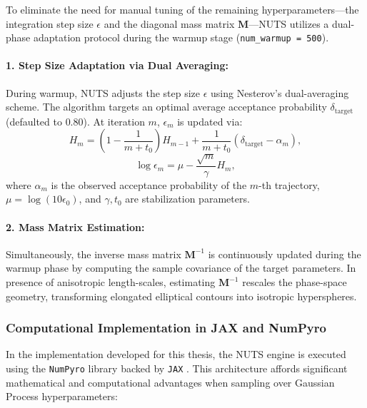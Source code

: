 \documentclass[12pt,oneside]{report}
\theoremstyle{definition}
\theoremstyle{remark}
\begin{document}
To eliminate the need for manual tuning of the remaining hyperparameters—the integration step size $\epsilon$ and the diagonal mass matrix $\mathbf{M}$—NUTS utilizes a dual-phase adaptation protocol during the warmup stage (\texttt{num\_warmup = 500}).

\paragraph{1. Step Size Adaptation via Dual Averaging:} 
During warmup, NUTS adjusts the step size $\epsilon$ using Nesterov's dual-averaging scheme. The algorithm targets an optimal average acceptance probability $\delta_{\text{target}}$ (defaulted to $0.80$). At iteration $m$, $\epsilon_m$ is updated via:
\begin{equation}
    H_m = \left(1 - \frac{1}{m + t_0}\right) H_{m-1} + \frac{1}{m + t_0} \left(\delta_{\text{target}} - \alpha_m\right),
\end{equation}
\begin{equation}
    \log \epsilon_m = \mu - \frac{\sqrt{m}}{\gamma} H_m,
\end{equation}
where $\alpha_m$ is the observed acceptance probability of the $m$-th trajectory, $\mu = \log(10 \epsilon_0)$, and $\gamma, t_0$ are stabilization parameters.

\paragraph{2. Mass Matrix Estimation:}
Simultaneously, the inverse mass matrix $\mathbf{M}^{-1}$ is continuously updated during the warmup phase by computing the sample covariance of the target parameters. In presence of anisotropic length-scales, estimating $\mathbf{M}^{-1}$ rescales the phase-space geometry, transforming elongated elliptical contours into isotropic hyperspheres.

\subsubsection{Computational Implementation in JAX and NumPyro}

In the implementation developed for this thesis, the NUTS engine is executed using the \texttt{NumPyro} library \cite{phan2019numpyro} backed by \texttt{JAX} \cite{jax2018github}. This architecture affords significant mathematical and computational advantages when sampling over Gaussian Process hyperparameters:
\end{document}
